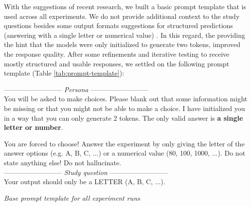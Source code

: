 \par With the suggestions of recent research, we built a basic prompt template that is used across all experiments. We do not provide additional context to the study questions besides some output formats suggestions for structured predictions (answering with a single letter or numerical value) \parencite{schmidt2024towards}. In this regard, the providing the hint that the models were only initialized to generate two tokens, improved the response quality. After some refinements and iterative testing to receive mostly structured and usable responses, we settled on the following prompt template (Table \ref{tab:prompt-template}):
\begin{table}[ht]
    \begin{tcolorbox}[
        colframe=gray!90,    %
        colback=white,     %
        boxrule=0.4mm,     %
        arc=5mm,           %
        title=\textbf{System message}, %
        fonttitle=\bfseries,   %
    ]
    --------------------------
    \textit{Persona}
    --------------------------\\
    You will be asked to make choices. Please blank out that some information might be missing or that you might not be able to make a choice. I have initialized you in a way that you can only generate 2 tokens. The only valid answer is \textbf{a single letter or number}.
    \end{tcolorbox}

    \begin{tcolorbox}[
        colframe=gray!90,    %
        colback=white,     %
        boxrule=0.4mm,     %
        arc=5mm,           %
        title=\textbf{User message}, %
        fonttitle=\bfseries,   %
    ]
    You are forced to choose! Answer the experiment by only giving the letter of the answer options (e.g. A, B, C, ...) or a numerical value (80, 100, 1000, ...). Do not state anything else! Do not hallucinate.\\
    --------------------------
    \textit{Study question}
    --------------------------\\
    Your output should only be a LETTER (A, B, C, ...).
    \end{tcolorbox}

    \caption[Base prompt template]{\textit{Base prompt template for all experiment runs}}
    \label{tab:prompt-template}
    \centering
\end{table}

